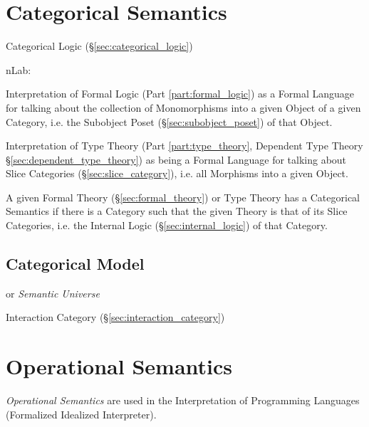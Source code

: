\section{Categorical Semantics}\label{sec:categorical_semantics}

Categorical Logic (\S\ref{sec:categorical_logic})

nLab:

Interpretation of Formal Logic (Part \ref{part:formal_logic}) as a
Formal Language for talking about the collection of Monomorphisms into
a given Object of a given Category, i.e. the Subobject Poset
(\S\ref{sec:subobject_poset}) of that Object.

Interpretation of Type Theory (Part \ref{part:type_theory}, Dependent
Type Theory \S\ref{sec:dependent_type_theory}) as being a Formal
Language for talking about Slice Categories
(\S\ref{sec:slice_category}), i.e. all Morphisms into a given Object.

A given Formal Theory (\S\ref{sec:formal_theory}) or Type Theory has a
Categorical Semantics if there is a Category such that the given
Theory is that of its Slice Categories, i.e. the Internal Logic
(\S\ref{sec:internal_logic}) of that Category.



\subsection{Categorical Model}\label{sec:categorical_model}

or \emph{Semantic Universe}

Interaction Category (\S\ref{sec:interaction_category})



\section{Operational Semantics}\label{sec:operational_semantics}

\emph{Operational Semantics} are used in the Interpretation of
Programming Languages (Formalized Idealized Interpreter).

